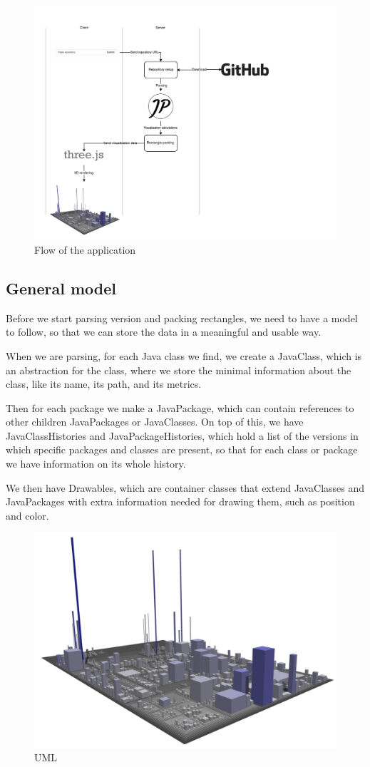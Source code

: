 \documentclass[]{usiinfbachelorproject}
\begin{document}
\begin{figure} [H]
\centering
\includegraphics[width=.8\textwidth]{pictures/controlFlow.pdf}
\caption{Flow of the application}
\label{fig:flow}
\end{figure}

\subsection{General model} \label{General model}
Before we start parsing version and packing rectangles, we need to have a model to follow, so that we can store the data in a meaningful and usable way.

When we are parsing, for each Java class we find, we create a JavaClass, which is an abstraction for the class, where we store the minimal information about the class, like its name, its path, and its metrics.

Then for each package we make a JavaPackage, which can contain references to other children JavaPackages or JavaClasses.
On top of this, we have JavaClassHistories and JavaPackageHistories, which hold a list of the versions in which specific packages and classes are present, so that for each class or package we have information on its whole history.

We then have Drawables, which are container classes that extend JavaClasses and JavaPackages with extra information needed for drawing them, such as position and color.

\begin{figure} [H]
\centering
\includegraphics[width=.5\textwidth]{pictures/example.png}
\caption{UML}
\label{fig:flow}
\end{figure}
\end{document}
